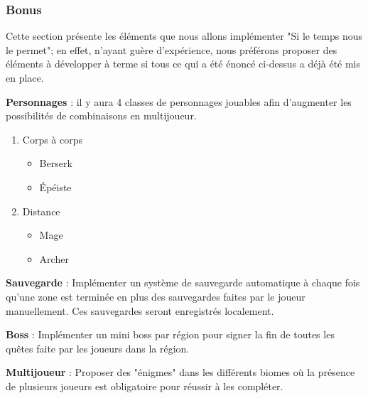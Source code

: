 \documentclass[12pt]{article}
\begin{document}
            \subsubsection{Bonus}
                Cette section présente les éléments que nous allons implémenter "Si le temps nous le permet"; en effet, n'ayant guère d'expérience, nous préférons proposer des éléments à développer à terme si tous ce qui a été énoncé ci-dessus a déjà été mis en place.
                \\
                \par \textbf{Personnages} : il y aura 4 classes de personnages jouables afin d'augmenter les possibilités de combinaisons en multijoueur.
                \begin{enumerate}
                \setlength{\itemindent}{2em}
                    \item Corps à corps
                    \begin{itemize}
                        \item Berserk
                        \item Épéiste
                    \end{itemize}
                    \item Distance
                    \begin{itemize}
                        \item Mage
                        \item Archer
                    \end{itemize}
                \end{enumerate} 
                
                \par \textbf{Sauvegarde} : Implémenter un système de sauvegarde automatique à chaque fois qu'une zone est terminée en plus des sauvegardes faites par le joueur manuellement.
                Ces sauvegardes seront enregistrés localement.
                \\
                \par \textbf{Boss} : Implémenter un mini boss par région pour signer la fin de toutes les quêtes faite par les joueurs dans la région.
                \\
                \par \textbf{Multijoueur} : Proposer des "énigmes" dans les différents biomes où la présence de plusieurs joueurs est obligatoire pour réussir à les compléter.
                \\
                
\end{document}
